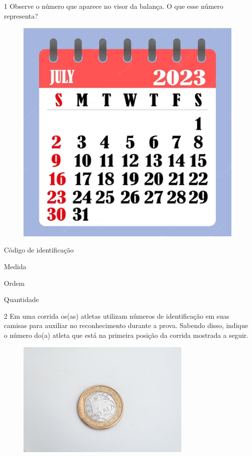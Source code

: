 \num{1} Observe o número que aparece no visor da balança. O que esse número
representa?

\begin{figure}[htpb!]
\centering
\includegraphics[width=.5\textwidth]{./media/image137.png}
\end{figure}

\begin{minipage}{.5\textwidth}
\begin{escolha}
\item Código de identificação

\item Medida

\item Ordem

\item Quantidade
\end{escolha}
\end{minipage}



\num{2} Em uma corrida os(as) atletas utilizam números de identificação em suas
camisas para auxiliar no reconhecimento durante a prova. Sabendo disso,
indique o número do(a) atleta que está na primeira posição da corrida
mostrada a seguir.

\begin{figure}[htpb!]
\includegraphics[width=\textwidth]{./media/image138.png}
\end{figure}

